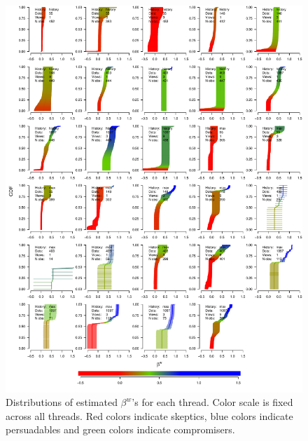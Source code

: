 \documentclass[9pt,a4paper,twocolumn,lineno]{article}
\begin{document}
\begin{figure}%
\centering
	\hspace{-30px}\includegraphics[width=1\linewidth]{allbetas}
	\caption{Distributions of estimated $\beta^w$'s for each thread. Color scale is fixed across all threads. Red colors indicate skeptics, blue colors indicate persuadables and green colors indicate compromisers.}\label{fig: weighted beta distributions}
\end{figure}
\newpage
\end{document}
